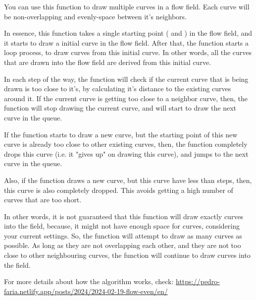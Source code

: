\documentclass[a4paper]{book}
\begin{document}
\begin{Details}
You can use this function to draw multiple curves in a flow field.
Each curve will be non-overlapping and evenly-space between it's
neighbors.

In essence, this function takes a single starting point ( and ) in the flow field,
and it starts to draw a initial curve in the flow field. After that, the function starts a loop process,
to draw  curves from this initial curve. In other words, all the curves that are drawn
into the flow field are derived from this initial curve.

In each step of the way, the function will check if the current curve that is being
drawn is too close to it's, by calculating it's distance to the existing curves
around it. If the current curve is getting too close to a neighbor curve, then,
the function will stop drawing the current curve, and will start to draw the
next curve in the queue.

If the function starts to draw a new curve, but the starting point of this new curve is already
too close to other existing curves, then, the function completely drops this curve (i.e.
it "gives up" on drawing this curve), and jumps to the next curve in the queue.

Also, if the function draws a new curve, but this curve have less than
 steps, then, this curve is also completely dropped.
This avoids getting a high number of curves that are too short.

In other words, it is not guaranteed that this function will draw exactly  curves
into the field, because, it might not have enough space for  curves, considering your current settings.
So, the function
will attempt to draw as many curves as possible. As long as they are not overlapping
each other, and they are not too close to other neighbouring curves, the function will
continue to draw curves into the field.

For more details about how the algorithm works, check: \url{https://pedro-faria.netlify.app/posts/2024/2024-02-19-flow-even/en/}
\end{Details}
%
\end{document}

